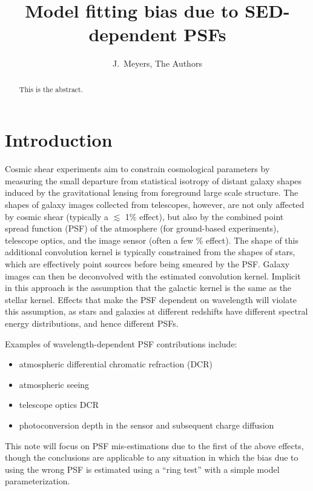 \documentclass[apj]{emulateapj}
\begin{document}
\title{Model fitting bias due to SED-dependent PSFs}

\author{
J.~Meyers,
The Authors}


\begin{abstract}
This is the abstract.
\end{abstract}

\section{Introduction}\label{sec:intro}
Cosmic shear experiments aim to constrain cosmological parameters by
measuring the small departure from statistical isotropy of distant
galaxy shapes induced by the gravitational lensing from foreground
large scale structure.  The shapes of galaxy images collected from
telescopes, however, are not only affected by cosmic shear (typically
a $\lesssim$ 1\% effect), but also by the combined point spread
function (PSF) of the atmosphere (for ground-based experiments),
telescope optics, and the image sensor (often a few \% effect).  The
shape of this additional convolution kernel is typically constrained
from the shapes of stars, which are effectively point sources before
being smeared by the PSF.  Galaxy images can then be deconvolved with
the estimated convolution kernel.  Implicit in this approach is the
assumption that the galactic kernel is the same as the stellar kernel.
Effects that make the PSF dependent on wavelength will violate this
assumption, as stars and galaxies at different redshifts have
different spectral energy distributions, and hence different PSFs.

Examples of wavelength-dependent PSF contributions include:

\begin{itemize}
  \item atmospheric differential chromatic refraction (DCR)
  \item atmospheric seeing
  \item telescope optics DCR
  \item photoconversion depth in the sensor and subsequent charge diffusion
\end{itemize}

This note will focus on PSF mis-estimations due to the first of the
above effects, though the conclusions are applicable to any situation
in which the bias due to using the wrong PSF is estimated using a
``ring test'' with a simple model parameterization.
\end{document}
